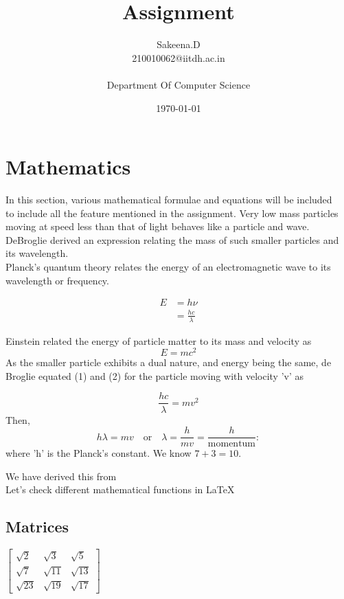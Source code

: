 \documentclass{article}
\title{Assignment}
\author{{Sakeena.D} \\
{210010062@iitdh.ac.in } \\
\\
{Department Of Computer Science}}
\date{\today}
\begin{document}
\maketitle
\newpage
\tableofcontents
\listoffigures
\listoftables
\newpage
\section{Mathematics}
In this section, various mathematical formulae and equations will be included\\
to include all the feature mentioned in the assignment. Very low mass particles\\
moving at speed less than that of light behaves like a particle and wave.\\
DeBroglie derived an expression relating the mass of such smaller particles and its
wavelength.\\
   Planck's quantum theory relates the energy of an electromagnetic wave to its wavelength or frequency.
       
\begin{equation}
\begin{split}
E &= h\nu \\
&= \frac{hc}{\lambda}
\end{split}
\end{equation}

Einstein related the energy of particle matter to its mass and velocity as
\begin{equation}
E = mc^2    
\end{equation}
As the smaller particle exhibits a dual nature, and energy being the same, de Broglie equated (1) and (2) for the particle moving with velocity 'v' as

\begin{equation*}
\frac{hc}{\lambda} = mv^2
\end{equation*}
Then,\begin{equation*} 
h\lambda = mv \quad \text{or} \quad \lambda = \frac{h}{mv} = \frac{h}{\text{momentum}}:
\end{equation*}where 'h' is the Planck’s constant. We know \(7 + 3 = 10\).

We have derived this from \cite{verma2008concepts}\\
Let's check different mathematical functions in \LaTeX

\subsection{Matrices}
\begin{flushleft}
 $\begin{bmatrix}
 \sqrt{2} & \sqrt{3} & \sqrt{5} \\
\sqrt{7} & \sqrt{11} & \sqrt{13} \\
\sqrt{23} & \sqrt{19} & \sqrt{17}
\end{bmatrix}
$
\end{flushleft}
\end{document}
